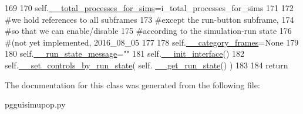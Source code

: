 \begin{DoxyCode}
169 
170         self.\hyperlink{classnegui_1_1pgguisimupop_1_1PGGuiSimuPop_a3885325060336297119229764f6548fb}{\_\_total\_processes\_for\_sims}=i\_total\_processes\_for\_sims
171 
172         \textcolor{comment}{#we hold references to all subframes}
173         \textcolor{comment}{#except the run-button subframe,}
174         \textcolor{comment}{#so that we can enable/disable}
175         \textcolor{comment}{#according to the simulation-run state}
176         \textcolor{comment}{#(not yet implemented, 2016\_08\_05}
177 
178         self.\hyperlink{classnegui_1_1pgguisimupop_1_1PGGuiSimuPop_a67da63f36462b56bd1f47206d8f91c7b}{\_\_category\_frames}=\textcolor{keywordtype}{None}
179 
180         self.\hyperlink{classnegui_1_1pgguisimupop_1_1PGGuiSimuPop_a3ac3a7a5a800876180133b4cc41ca63c}{\_\_run\_state\_message}=\textcolor{stringliteral}{""}
181         self.\hyperlink{classnegui_1_1pgguisimupop_1_1PGGuiSimuPop_ad38b601eabe45f6c35525b060f0343ea}{\_\_init\_interface}()
182         self.\hyperlink{classnegui_1_1pgguisimupop_1_1PGGuiSimuPop_a2c5268e62f40c2548d1475959aa60ca9}{\_\_set\_controls\_by\_run\_state}( self.
      \hyperlink{classnegui_1_1pgguisimupop_1_1PGGuiSimuPop_aef182e14bccdbabf372a6344bc6f8786}{\_\_get\_run\_state}() )
183     
184         \textcolor{keywordflow}{return}
\end{DoxyCode}


The documentation for this class was generated from the following file\+:\begin{DoxyCompactItemize}
\item 
pgguisimupop.\+py\end{DoxyCompactItemize}
